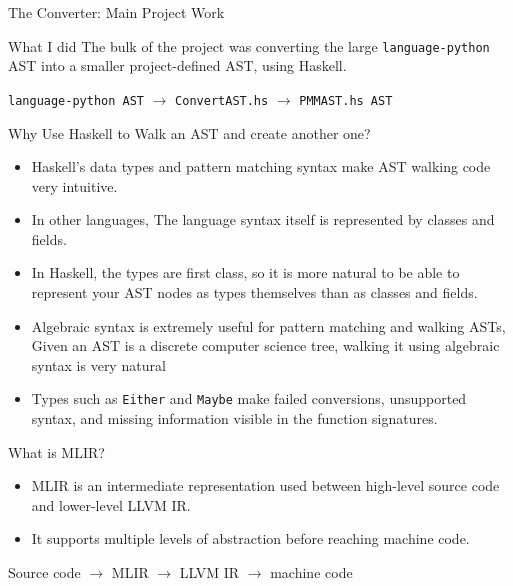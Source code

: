 \documentclass[aspectratio=169,11pt]{beamer}
\begin{document}
\begin{frame}{The Converter: Main Project Work}
	\begin{block}{What I did}
		The bulk of the project was converting the large \texttt{language-python} AST into a smaller project-defined AST, using Haskell.
	\end{block}
	\centering
	\Large
	\texttt{language-python AST}
	$\rightarrow$
	\texttt{ConvertAST.hs}
	$\rightarrow$
	\texttt{PMMAST.hs AST}
\end{frame}
\begin{frame}{Why Use Haskell to Walk an AST and create another one?}
	\begin{itemize}
		\item Haskell's data types and pattern matching syntax make AST walking code very
		      intuitive.
		\item In other languages, The language syntax itself is represented by classes and
		      fields.
		\item In Haskell, the types are first class, so it is more natural to be able to
		      represent your AST nodes as types themselves than as classes and fields.
		\item Algebraic syntax is extremely useful for pattern matching and walking ASTs,
		      Given an AST is a discrete computer science tree, walking it using algebraic
		      syntax is very natural
		\item Types such as \texttt{Either} and \texttt{Maybe} make failed conversions,
		      unsupported syntax, and missing information visible in the function signatures.
	\end{itemize}
\end{frame}
\begin{frame}{What is MLIR?}
	\begin{itemize}
		\item MLIR is an intermediate representation used between high-level source code and
		      lower-level LLVM IR.
		\item It supports multiple levels of abstraction before reaching machine code.
	\end{itemize}

	\vspace{0.35cm}
	\centering
	\Large
	Source code $\rightarrow$ MLIR $\rightarrow$ LLVM IR $\rightarrow$ machine code
\end{frame}
\end{document}
